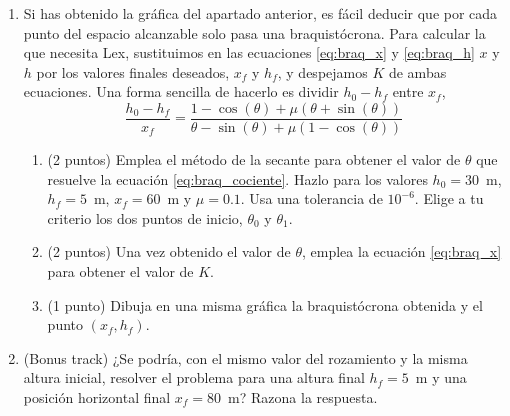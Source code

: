 \begin{enumerate}
\begin{enumerate}
		\item (2 puntos) Utilizando la función que has creado en el apartado anterior y tomando $h_0=30$ y $\mu = 0.1$, calcula dos vectores $x,h$ para valores de $\theta$ comprendidos en el intervalo $[0,2\pi)$, con una distancia entre valores de $0.01$. Repite el cálculo para 40 valores de $K$ distintos comprendidos en el intervalo $[0, h_0/(2+\pi\mu)]$. Dibuja todos los resultados obtenidos, $h$ frente a $x$, en una misma gráfica.
	\end{enumerate}
	\item Si has obtenido la gráfica del apartado anterior, es fácil deducir que por cada punto del espacio alcanzable solo pasa una braquistócrona. Para calcular la que necesita Lex, sustituimos en las ecuaciones \ref{eq:braq_x} y \ref{eq:braq_h} $x$ y $h$ por los valores finales deseados, $x_f$ y $h_f$, y despejamos $K$ de ambas ecuaciones. Una forma sencilla de hacerlo es dividir $h_0-h_f$ entre $x_f$,
	\begin{equation}\label{eq:braq_cociente}
		\frac{h_0-h_f}{x_f} = \frac{1-\cos(\theta) + \mu(\theta+\sin(\theta))}
		{\theta-\sin(\theta) + \mu(1-\cos(\theta))}
	\end{equation}
	\begin{enumerate}
		\item (2 puntos) Emplea el método de la secante para obtener el valor de $\theta$ que resuelve la ecuación \ref{eq:braq_cociente}. Hazlo para los valores $h_0=30$~m, $h_f=5$~m, $x_f=60$~m y $\mu=0.1$. Usa una tolerancia de $10^{-6}$. Elige a tu criterio los dos puntos de inicio, $\theta_0$ y $\theta_1$.

		\item (2 puntos) Una vez obtenido el valor de $\theta$, emplea la ecuación \ref{eq:braq_x} para obtener el valor de $K$.

		\item (1 punto) Dibuja en una misma gráfica la braquistócrona obtenida y el punto $(x_f,h_f)$.

	\end{enumerate}

	\item (Bonus track) ¿Se podría, con el mismo valor del rozamiento y la misma altura inicial, resolver el problema para una altura final $h_f=5$~m y una posición horizontal final $x_f = 80$~m? Razona la respuesta.
\end{enumerate}

\fussy
